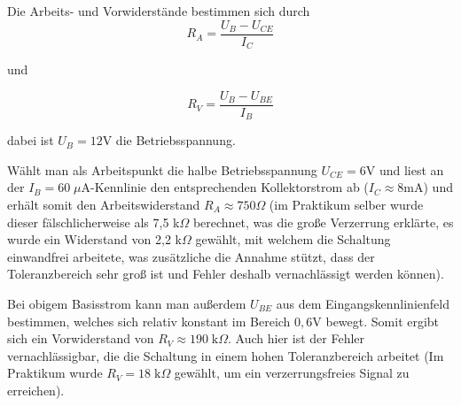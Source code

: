 \documentclass[a4paper,german,12pt,smallheadings]{scrartcl}
\begin{document}
Die Arbeits- und Vorwiderstände bestimmen sich durch
\begin{equation}
  R_A = \frac{U_B - U_{CE}}{I_C}
\end{equation}

und

\begin{equation}
  R_V = \frac{U_B - U_{BE}}{I_B}
\end{equation}

dabei ist $U_B = 12$V die Betriebsspannung.

Wählt man als Arbeitspunkt die halbe Betriebsspannung $U_{CE} = 6$V und liest
an der $I_B = 60\;\mu\text{A}$-Kennlinie den entsprechenden Kollektorstrom ab
($I_C \approx 8$mA) und erhält somit den Arbeitswiderstand
$R_A \approx 750 \Omega$ (im Praktikum selber wurde dieser fälschlicherweise
als 7{,}5 k$\Omega$ berechnet, was die große Verzerrung erklärte, es wurde ein
Widerstand von 2{,}2 k$\Omega$ gewählt, mit welchem die Schaltung einwandfrei
arbeitete, was zusätzliche die Annahme stützt, dass der Toleranzbereich sehr
groß ist und Fehler deshalb vernachlässigt werden können).

Bei obigem Basisstrom kann man außerdem $U_{BE}$ aus dem Eingangskennlinienfeld
bestimmen, welches sich relativ konstant im Bereich $0{,}6$V bewegt. Somit
ergibt sich ein Vorwiderstand von $R_V \approx 190\;\text{k}\Omega$. Auch hier
ist der Fehler vernachlässigbar, die die Schaltung in einem hohen
Toleranzbereich arbeitet (Im Praktikum wurde $R_V = 18 \;\text{k}\Omega$
gewählt, um ein verzerrungsfreies Signal zu erreichen).
\end{document}
